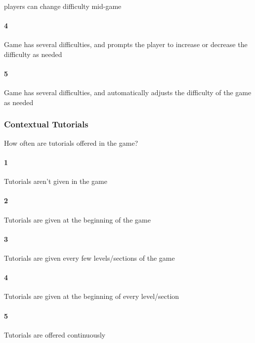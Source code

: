 players can change difficulty mid-game\paragraph{4}Game has several difficulties, and prompts the player to increase or decrease the difficulty as needed\paragraph{5}Game has several difficulties, and automatically adjusts the difficulty of the game as needed\subsubsection{Contextual Tutorials}How often are tutorials offered in the game?\paragraph{1}Tutorials aren't given in the game\paragraph{2}Tutorials are given at the beginning of the game\paragraph{3}Tutorials are given every few levels/sections of the game\paragraph{4}Tutorials are given at the beginning of every level/section\paragraph{5}Tutorials are offered continuously